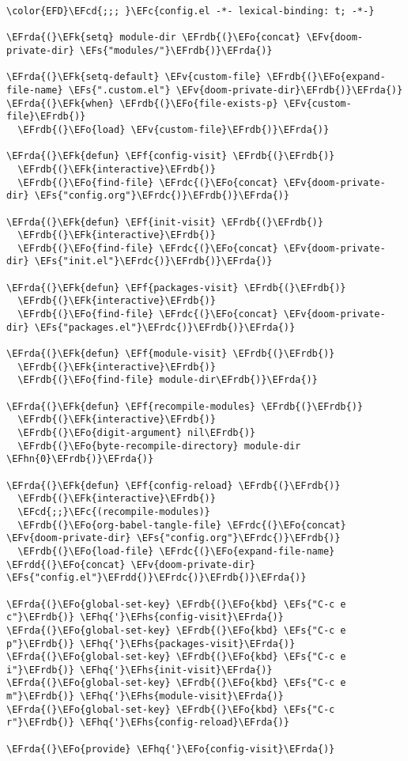 \documentclass[a4wide,10pt]{article}
\newcommand{\EFc}[1]{\textcolor{EFc}{#1}} %
\newcommand{\EFcd}[1]{\textcolor{EFcd}{#1}} %
\newcommand{\EFs}[1]{\textcolor{EFs}{#1}} %
\newcommand{\EFk}[1]{\textcolor{EFk}{#1}} %
\newcommand{\EFf}[1]{\textcolor{EFf}{#1}} %
\newcommand{\EFv}[1]{\textcolor{EFv}{#1}} %
\newcommand{\EFo}[1]{\textcolor{EFo}{#1}} %
\newcommand{\EFhn}[1]{\textcolor{EFhn}{\textbf{#1}}} %
\newcommand{\EFhq}[1]{\textcolor{EFhq}{#1}} %
\newcommand{\EFhs}[1]{\textcolor{EFhs}{#1}} %
\newcommand{\EFrda}[1]{\textcolor{EFrda}{#1}} %
\newcommand{\EFrdb}[1]{\textcolor{EFrdb}{#1}} %
\newcommand{\EFrdc}[1]{\textcolor{EFrdc}{#1}} %
\newcommand{\EFrdd}[1]{\textcolor{EFrdd}{#1}} %
\begin{document}
\begin{Code}
\begin{Verbatim}
\color{EFD}\EFcd{;;; }\EFc{config.el -*- lexical-binding: t; -*-}

\EFrda{(}\EFk{setq} module-dir \EFrdb{(}\EFo{concat} \EFv{doom-private-dir} \EFs{"modules/"}\EFrdb{)}\EFrda{)}

\EFrda{(}\EFk{setq-default} \EFv{custom-file} \EFrdb{(}\EFo{expand-file-name} \EFs{".custom.el"} \EFv{doom-private-dir}\EFrdb{)}\EFrda{)}
\EFrda{(}\EFk{when} \EFrdb{(}\EFo{file-exists-p} \EFv{custom-file}\EFrdb{)}
  \EFrdb{(}\EFo{load} \EFv{custom-file}\EFrdb{)}\EFrda{)}

\EFrda{(}\EFk{defun} \EFf{config-visit} \EFrdb{(}\EFrdb{)}
  \EFrdb{(}\EFk{interactive}\EFrdb{)}
  \EFrdb{(}\EFo{find-file} \EFrdc{(}\EFo{concat} \EFv{doom-private-dir} \EFs{"config.org"}\EFrdc{)}\EFrdb{)}\EFrda{)}

\EFrda{(}\EFk{defun} \EFf{init-visit} \EFrdb{(}\EFrdb{)}
  \EFrdb{(}\EFk{interactive}\EFrdb{)}
  \EFrdb{(}\EFo{find-file} \EFrdc{(}\EFo{concat} \EFv{doom-private-dir} \EFs{"init.el"}\EFrdc{)}\EFrdb{)}\EFrda{)}

\EFrda{(}\EFk{defun} \EFf{packages-visit} \EFrdb{(}\EFrdb{)}
  \EFrdb{(}\EFk{interactive}\EFrdb{)}
  \EFrdb{(}\EFo{find-file} \EFrdc{(}\EFo{concat} \EFv{doom-private-dir} \EFs{"packages.el"}\EFrdc{)}\EFrdb{)}\EFrda{)}

\EFrda{(}\EFk{defun} \EFf{module-visit} \EFrdb{(}\EFrdb{)}
  \EFrdb{(}\EFk{interactive}\EFrdb{)}
  \EFrdb{(}\EFo{find-file} module-dir\EFrdb{)}\EFrda{)}

\EFrda{(}\EFk{defun} \EFf{recompile-modules} \EFrdb{(}\EFrdb{)}
  \EFrdb{(}\EFk{interactive}\EFrdb{)}
  \EFrdb{(}\EFo{digit-argument} nil\EFrdb{)}
  \EFrdb{(}\EFo{byte-recompile-directory} module-dir \EFhn{0}\EFrdb{)}\EFrda{)}

\EFrda{(}\EFk{defun} \EFf{config-reload} \EFrdb{(}\EFrdb{)}
  \EFrdb{(}\EFk{interactive}\EFrdb{)}
  \EFcd{;;}\EFc{(recompile-modules)}
  \EFrdb{(}\EFo{org-babel-tangle-file} \EFrdc{(}\EFo{concat} \EFv{doom-private-dir} \EFs{"config.org"}\EFrdc{)}\EFrdb{)}
  \EFrdb{(}\EFo{load-file} \EFrdc{(}\EFo{expand-file-name} \EFrdd{(}\EFo{concat} \EFv{doom-private-dir} \EFs{"config.el"}\EFrdd{)}\EFrdc{)}\EFrdb{)}\EFrda{)}

\EFrda{(}\EFo{global-set-key} \EFrdb{(}\EFo{kbd} \EFs{"C-c e c"}\EFrdb{)} \EFhq{'}\EFhs{config-visit}\EFrda{)}
\EFrda{(}\EFo{global-set-key} \EFrdb{(}\EFo{kbd} \EFs{"C-c e p"}\EFrdb{)} \EFhq{'}\EFhs{packages-visit}\EFrda{)}
\EFrda{(}\EFo{global-set-key} \EFrdb{(}\EFo{kbd} \EFs{"C-c e i"}\EFrdb{)} \EFhq{'}\EFhs{init-visit}\EFrda{)}
\EFrda{(}\EFo{global-set-key} \EFrdb{(}\EFo{kbd} \EFs{"C-c e m"}\EFrdb{)} \EFhq{'}\EFhs{module-visit}\EFrda{)}
\EFrda{(}\EFo{global-set-key} \EFrdb{(}\EFo{kbd} \EFs{"C-c r"}\EFrdb{)} \EFhq{'}\EFhs{config-reload}\EFrda{)}

\EFrda{(}\EFo{provide} \EFhq{'}\EFo{config-visit}\EFrda{)}
\end{Verbatim}
\end{Code}
\end{document}
